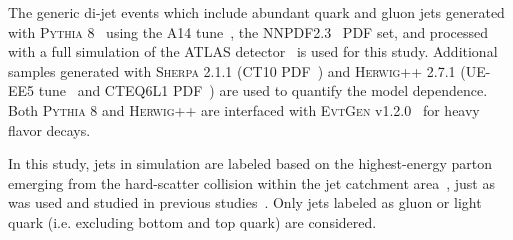 The generic di-jet events which include abundant quark and gluon jets generated with \textsc{Pythia} 8~\cite{Pythia,Pythia8} using the A14 tune~\cite{ATL-PHYS-PUB-2014-021}, the NNPDF2.3~\cite{Ball:2014uwa} PDF set, and processed with a full simulation of the ATLAS detector~\cite{Agostinelli:2002hh,Aad:2010ah} is used for this study.  Additional samples generated with \textsc{Sherpa} 2.1.1 (CT10 PDF~\cite{Gao:2013xoa}) and \textsc{Herwig++} 2.7.1 (UE-EE5 tune~\cite{Seymour:2013qka} and CTEQ6L1 PDF~\cite{Stump:2003yu}) are used to quantify the model dependence. Both \textsc{Pythia} 8 and \textsc{Herwig++} are interfaced with \textsc{EvtGen} v1.2.0~\cite{Lange:2001uf} for heavy flavor decays.

In this study, jets in simulation are 
labeled based on the highest-energy parton emerging from the hard-scatter collision within the jet catchment area~\cite{jetareas}, 
just as was used and studied in previous studies~\cite{ATL-PHYS-PUB-2017-009}.
Only jets labeled as gluon or light quark (i.e. excluding bottom and top quark) are considered.

